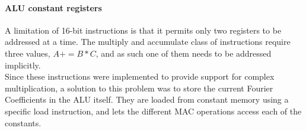 \paragraph{ALU constant registers}
A limitation of 16-bit instructions is that it permits only two registers to be
addressed at a time. The multiply and accumulate class of instructions require
three values, $A += B*C$, and as such one of them needs to be addressed
implicitly.\\
Since these instructions were implemented to provide support for
complex multiplication, a solution to this problem was to store the current Fourier
Coefficients in the ALU itself. They are loaded from constant memory using a
specific load instruction, and lets the different MAC operations access each of
the constants.

